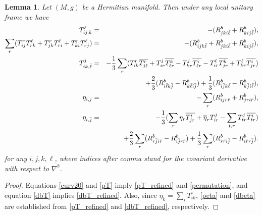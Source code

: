 \documentclass{amsart}
\numberwithin{equation}{section}
\newtheorem{lemma}  [theorem]     {Lemma}
\theoremstyle{definition}
\renewcommand{\1}{\mathds{1}}
\renewcommand{\>}{\rightarrow}
\begin{document}
\begin{lemma} \label{lemma3.2}
Let $(M,g)$ be a Hermitian manifold. Then under any local unitary frame we have
\begin{eqnarray}
T^{\ell}_{ij,k} &= & -(R^b_{jki \bar{\ell}} + R^b_{kij \bar{\ell}}), \label{pT_refined}\\
\sum_r(T^r_{ij}T^{\ell}_{rk} + T^r_{jk}T^{\ell}_{ri} + T^r_{ki}T^{\ell}_{rj}) &=&
-(R^b_{ijk \bar{\ell}} + R^b_{jki \bar{\ell}} + R^b_{kij \bar{\ell}}), \label{permutation}\\
T^j_{ik,\bar{\ell}} & = & -\frac{1}{3} \sum_r(T^r_{ik}\overline{T^r_{j\ell}} + T^j_{ir} \overline{T^k_{\ell r}}
- T^j_{kr}\overline{T^i_{\ell r}} -T^\ell_{ir} \overline{T^k_{jr}} + T^\ell_{kr}\overline{T^i_{jr}}) \label{dbT_refined}\\
&&+ \frac{2}{3} (R^b_{i \bar{\ell} k \bar{j}} - R^b_{k \bar{\ell} i \bar{j}})
+ \frac{1}{3} (R^b_{i \bar{j} k \bar{\ell}} - R^b_{k \bar{j} i \bar{\ell}}), \notag\\
\eta_{i,j} & = & - \sum_r (R^b_{ijr\bar{r}} + R^b_{jri\bar{r}}), \label{peta}\\
\eta_{i,\bar{j}} & = & -\frac{1}{3}(\sum_{r}\eta_r \overline{T^i_{jr}} + \overline{\eta}_r T^j_{ir} - \sum_{t,r}T^j_{tr}\overline{T^i_{tr}}) \label{dbeta} \\
& & + \frac{2}{3}\sum_{r}(R^b_{r\bar{j}i\bar{r}} - R^b_{i\bar{j}r\bar{r}})
+ \frac{1}{3}\sum_r(R^b_{r\bar{r}i\bar{j}} - R^b_{i\bar{r}r\bar{j}}) \notag.
\end{eqnarray}
for any $i,j,k,\ell$, where indices after comma stand for the covariant derivative with respect to $\nabla^{b}$.
\end{lemma}

\begin{proof}
Equations \eqref{curv20} and \eqref{pT} imply  \eqref{pT_refined} and \eqref{permutation}, and equation \eqref{dbT} implies \eqref{dbT_refined}. Also, since $\eta_k=\sum_i T^i_{ik}$, \eqref{peta} and \eqref{dbeta} are established from \eqref{pT_refined} and \eqref{dbT_refined}, respectively.
\end{proof}
\end{document}
